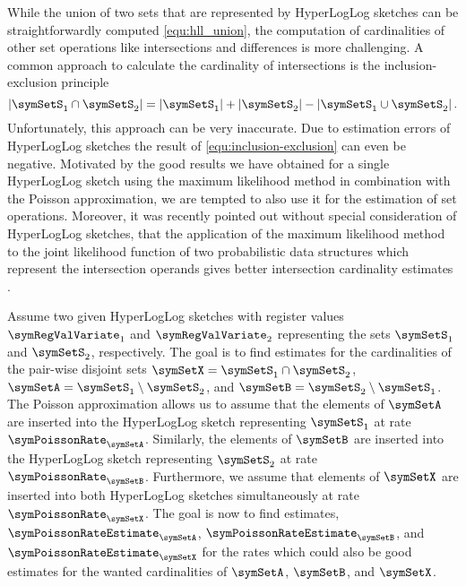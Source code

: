 \documentclass[a4paper]{scrartcl}
\begin{document}
While the union of two sets that are represented by HyperLogLog sketches can be straightforwardly computed \eqref{equ:hll_union}, the computation of cardinalities of other set operations like intersections and differences is more challenging. A common approach to calculate the cardinality of intersections is the inclusion-exclusion principle
\begin{equation}
\label{equ:inclusion-exclusion}
\left\vert\symSetS_1 \cap \symSetS_2\right\vert
=  
\left\vert\symSetS_1\right\vert  
+
\left\vert\symSetS_2\right\vert
-
\left\vert\symSetS_1 \cup \symSetS_2\right\vert.
\end{equation}
Unfortunately, this approach can be very inaccurate. Due to estimation errors of HyperLogLog sketches the result of \eqref{equ:inclusion-exclusion} can even be negative. Motivated by the good results we have obtained for a single HyperLogLog sketch using the maximum likelihood method in combination with the Poisson approximation, we are tempted to also use it for the estimation of set operations. Moreover, it was recently pointed out without special consideration of HyperLogLog sketches, that the application of the maximum likelihood method to the joint likelihood function of two probabilistic data structures which represent the intersection operands gives better intersection cardinality estimates \cite{Ting2016}.

Assume two given  HyperLogLog sketches with register values $\boldsymbol{\symRegValVariate}_1$ and $\boldsymbol{\symRegValVariate}_2$ representing the sets $\symSetS_1$ and $\symSetS_2$, respectively. The goal is to find estimates for the cardinalities of the pair-wise disjoint sets $\symSetX = \symSetS_1\cap\symSetS_2$, $\symSetA = \symSetS_1\setminus\symSetS_2$, and $\symSetB = \symSetS_2\setminus\symSetS_1$. The Poisson approximation allows us to assume that the elements of $\symSetA$ are inserted into the HyperLogLog sketch representing $\symSetS_1$ at rate $\symPoissonRate_\symSetA$. Similarly, the elements of $\symSetB$ are inserted into the HyperLogLog sketch representing $\symSetS_2$ at rate $\symPoissonRate_\symSetB$. Furthermore, we assume that elements of $\symSetX$ are inserted into both HyperLogLog sketches simultaneously at rate $\symPoissonRate_\symSetX$. The goal is now to find estimates, $\symPoissonRateEstimate_\symSetA$, $\symPoissonRateEstimate_\symSetB$, and $\symPoissonRateEstimate_\symSetX$ for the rates which could also be good estimates for the wanted cardinalities of $\symSetA$, $\symSetB$, and $\symSetX$. 
\end{document}
